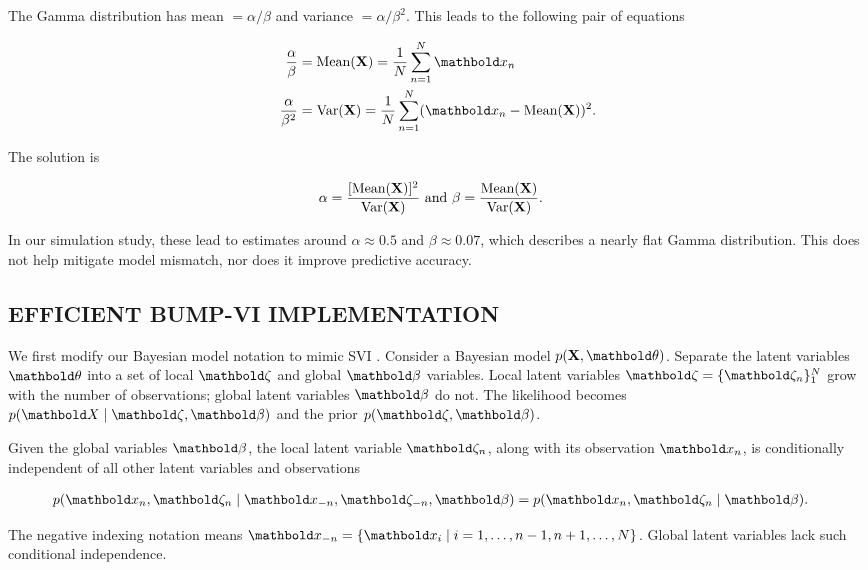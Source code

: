 The Gamma distribution has mean $= \alpha/\beta$ and variance $= \alpha/\beta^2$.
This leads to the following pair of equations
\begin{linenomath}
\begin{align*}
  \frac{\alpha}{\beta}
  &=
  \text{Mean}(\mbX)
  =
  \frac{1}{N}\sum_{n=1}^N \mbx_n\\
  \frac{\alpha}{\beta^2}
  &=
  \text{Var}(\mbX)
  =
  \frac{1}{N}\sum_{n=1}^N (\mbx_n - \text{Mean}(\mbX))^2.
\end{align*}
\end{linenomath}
The solution is
\begin{linenomath}
\begin{align*}
  \alpha
  &=
  \frac{[\text{Mean}(\textbf{X})]^2}{\text{Var}(\textbf{X})}
  \text{ and }
  \beta
  =
  \frac{\text{Mean}(\textbf{X})}{\text{Var}(\textbf{X})}.
\end{align*}
\end{linenomath}
In our simulation study, these lead to estimates around $\alpha \approx 0.5$ and
$\beta \approx 0.07$, which describes a nearly flat Gamma
distribution. This does not help mitigate model mismatch, nor does it improve
predictive accuracy.

\subsection*{EFFICIENT BUMP-VI IMPLEMENTATION\hspace*{-20pt}}

We first modify our Bayesian model notation to mimic
\gls{SVI} \citep{hoffman2013stochastic}.
Consider a Bayesian model $p(\mbX,\mbtheta)$. Separate the
latent variables $\mbtheta$ into a set of local $\mbzeta$ and
global $\mbbeta$ variables. Local latent variables $\mbzeta = \{\mbzeta_n\}_1^N$
grow with the number of observations; global latent variables $\mbbeta$ do not.
The likelihood becomes $p(\mb{X} \mid \mbzeta, \mbbeta)$ and the prior
$p(\mbzeta, \mbbeta)$.

Given the global variables $\mbbeta$, the local latent variable $\mbzeta_n$,
along with its observation $\mbx_n$, is conditionally independent of
all other latent variables and observations
\begin{linenomath}
\begin{align*}
  p(\mbx_n,\mbzeta_n \mid \mbx_{-n},\mbzeta_{-n}, \mbbeta)
  &=
  p(\mbx_n,\mbzeta_n \mid \mbbeta).
\end{align*}
\end{linenomath}
The negative indexing notation means $\mbx_{-n} = \{\mbx_i \mid i = 1,\dots,
n-1, n+1,\dots, N \}$. Global latent variables lack such
conditional independence.

